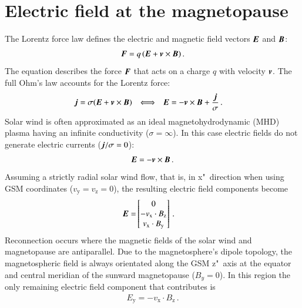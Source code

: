 \section{Electric field at the magnetopause}
\label{sec:electric_field_at_the_magnetopause}
The Lorentz force law defines the electric and magnetic field vectors $\boldsymbol{E}$ and $\boldsymbol{B}$:
\begin{align}
	\boldsymbol{F} = q\,(\boldsymbol{E} + \boldsymbol{v} \times \boldsymbol{B})	\,.
\end{align}
The equation describes the force $\boldsymbol{F}$ that acts on a charge $q$ with velocity $\boldsymbol{v}$. The full Ohm's law accounts for the Lorentz force:
\begin{align*}
	\boldsymbol{j} &= \sigma(\boldsymbol{E} + \boldsymbol{v} \times \boldsymbol{B})	& \Longleftrightarrow	&	&	\boldsymbol{E} &= - \boldsymbol{v} \times \boldsymbol{B} + \frac{\boldsymbol{j}}{\sigma}	\,.
\end{align*}
Solar wind is often approximated as an ideal magnetohydrodynamic (MHD) plasma having an infinite conductivity ($\sigma = \infty$). In this case electric fields do not generate electric currents ($\boldsymbol{j} / \sigma = 0$):
\begin{align}
	\boldsymbol{E} = - \boldsymbol{v} \times \boldsymbol{B}	\,.
\end{align}
Assuming a strictly radial solar wind flow, that is, in x"~direction when using GSM coordinates ($v_\text{y} = v_\text{z} = 0$), the resulting electric field components become
\begin{align}
	\boldsymbol{E} =& \begin{bmatrix}
		0\\
		- v_\text{x} \cdot B_\text{z}\\
		v_\text{x} \cdot B_\text{y}
	\end{bmatrix}	\,.
\end{align}
Reconnection occurs where the magnetic fields of the solar wind and magnetopause are antiparallel. Due to the magnetosphere's dipole topology, the magnetospheric field is always orientated along the GSM z"~axis at the equator and central meridian of the sunward magnetopause ($B_y = 0$). In this region the only remaining electric field component that contributes is
\begin{align}
	E_\text{y} = - v_\text{x} \cdot B_\text{z}	\,.
\end{align}

